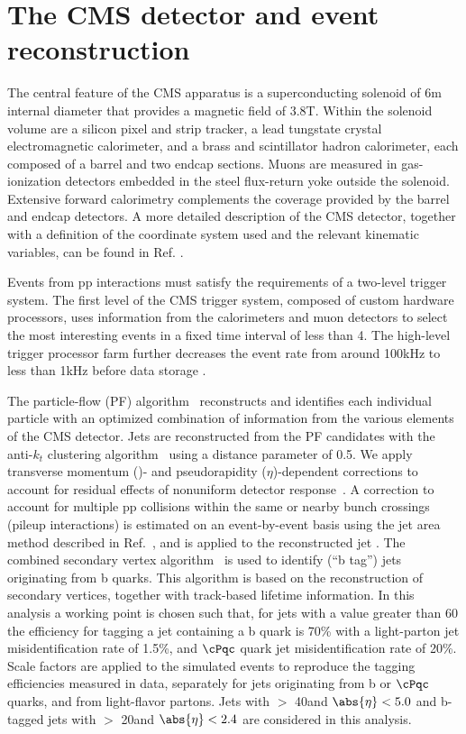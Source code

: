\section{The CMS detector and event reconstruction}
\label{sect:CMSRec} 
The central feature of the CMS apparatus is a superconducting solenoid of 6\unit{m} 
internal diameter that provides a magnetic field of 3.8\unit{T}. Within the solenoid 
volume are a silicon pixel and strip tracker, a lead tungstate crystal electromagnetic 
calorimeter, and a brass and scintillator hadron calorimeter, each composed of a barrel 
and two endcap sections. Muons are measured in gas-ionization detectors embedded in the 
steel flux-return yoke outside the solenoid. Extensive forward calorimetry complements the coverage provided by the barrel and endcap detectors. 
A more detailed description of the CMS detector, together with a definition of the coordinate system used 
and the relevant kinematic variables, can be found in Ref. \cite{Chatrchyan:2008zzk}.

Events from pp interactions must satisfy the requirements of a two-level trigger system.
The first level of the CMS trigger system, composed of custom hardware processors, uses information from the 
calorimeters and muon detectors to select the most interesting events in a fixed time interval of less than 4\mus. 
The high-level trigger processor farm further decreases the event rate from around 100\unit{kHz} to less than 1\unit{kHz} 
before data storage \cite{Khachatryan:2016bia}.

The particle-flow (PF) algorithm~\cite{CMS-PAS-PFT-09-001,CMS-PAS-PFT-10-001} reconstructs and identifies each 
individual particle with an optimized combination of information from the various elements of the CMS detector. 
Jets are reconstructed from the PF candidates with the anti-$k_t$ clustering
algorithm~\cite{Cacciari:2008gp} using a distance parameter of 0.5. We apply 
transverse momentum (\pt)- and pseudorapidity ($\eta$)-dependent corrections to account for residual
effects of nonuniform detector response~\cite{Chatrchyan:2011ds}.
A correction to account for multiple pp collisions within the same or nearby
bunch crossings (pileup interactions) is estimated on an event-by-event basis using the
jet area method described in Ref.~\cite{Cacciari:2007fd}, and is
applied to the reconstructed jet \pt.
The combined secondary vertex algorithm~\cite{Chatrchyan:2012jua} is used to identify (``b tag'') jets 
originating from b quarks.  This algorithm  is based on the reconstruction of secondary vertices, together with track-based lifetime information. 
In this analysis a working point is chosen such that, for jets with a \PT value greater than 60\GeV 
the efficiency for tagging a jet containing a b quark is 70\% with a light-parton jet misidentification rate of 1.5\%, 
and $\cPqc$ quark jet misidentification rate of 20\%.
Scale factors are applied to the simulated events to reproduce the tagging efficiencies measured in data, 
separately for jets originating from b or $\cPqc$ quarks, and from light-flavor partons.
Jets with  \PT $>$ 40\GeV and $\abs{\eta} < 5.0$ and b-tagged jets with \PT $>$ 20\GeV and $\abs{\eta} < 2.4$ are considered in this analysis.


